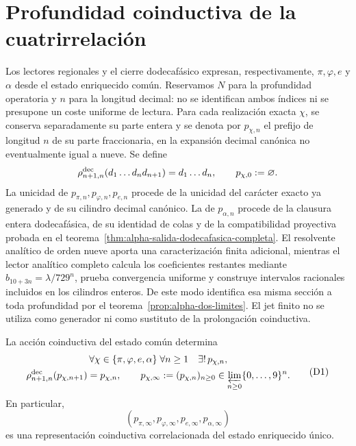 \section{Profundidad coinductiva de la cuatrirrelación}
\label{sec:profundidad-cuatrirrelacion-ch}

Los lectores regionales y el cierre dodecafásico expresan, respectivamente,
\(\pi,\varphi,e\) y \(\alpha\) desde el estado enriquecido común. Reservamos
\(N\) para la profundidad operatoria y \(n\) para la longitud decimal:
no se identifican ambos índices ni se presupone un coste uniforme de lectura.
Para cada realización exacta \(\chi\), se conserva separadamente su parte
entera y se denota por \(p_{\chi,n}\) el prefijo de longitud \(n\) de su
parte fraccionaria, en la expansión decimal canónica no eventualmente igual
a nueve. Se define
\[
 \rho^{\rm dec}_{n+1,n}(d_1\ldots d_nd_{n+1})=d_1\ldots d_n,
 \qquad p_{\chi,0}:=\varnothing.
\]
La unicidad de \(p_{\pi,n},p_{\varphi,n},p_{e,n}\) procede de la unicidad del
carácter exacto ya generado y de su cilindro decimal canónico. La de
\(p_{\alpha,n}\) procede de la clausura entera dodecafásica, de su identidad
de colas y de la compatibilidad proyectiva probada en el
teorema~\ref{thm:alpha-salida-dodecafasica-completa}. El resolvente analítico
de orden nueve aporta una caracterización finita adicional, mientras el
lector analítico completo calcula los coeficientes restantes mediante
\(b_{10+3n}=\lambda/729^n\), prueba convergencia uniforme y construye
intervalos racionales incluidos en los cilindros enteros. De este modo
identifica esa misma sección a toda profundidad por el
teorema~\ref{prop:alpha-dos-limites}. El jet finito no se utiliza como
generador ni como sustituto de la prolongación coinductiva.

\begin{theorem}
\label{thm:profundidad-cuatrirrelacion-ch}
La acción coinductiva del estado común determina
\[
 \begin{gathered}
  \forall\chi\in\{\pi,\varphi,e,\alpha\}\;
  \forall n\ge1\quad\exists!\,p_{\chi,n},\\
  \rho^{\rm dec}_{n+1,n}(p_{\chi,n+1})=p_{\chi,n},
  \qquad
  p_{\chi,\infty}:=(p_{\chi,n})_{n\ge0}
  \in\varprojlim_{n\ge0}\{0,\ldots,9\}^{n}.
 \end{gathered}
\tag{D1}
\label{eq:profundidad-cuatrirrelacion-ch}
\]
En particular,
\[
 (p_{\pi,\infty},p_{\varphi,\infty},p_{e,\infty},p_{\alpha,\infty})
\tag{D2}
\label{eq:cuatrirrelacion-infinita-ch}
\]
es una representación coinductiva correlacionada del estado enriquecido único.
\end{theorem}

